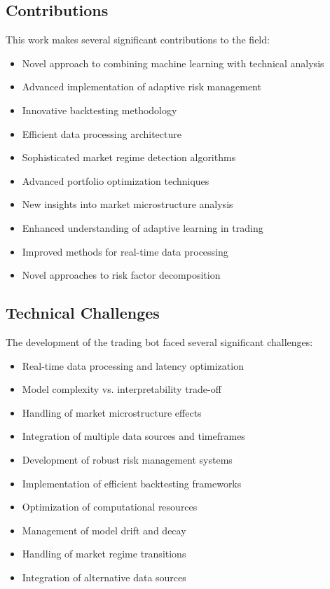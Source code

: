 \documentclass[conference]{IEEEtran}
\begin{document}
\subsection{Contributions}
This work makes several significant contributions to the field:
\begin{itemize}
    \item Novel approach to combining machine learning with technical analysis
    \item Advanced implementation of adaptive risk management
    \item Innovative backtesting methodology
    \item Efficient data processing architecture
    \item Sophisticated market regime detection algorithms
    \item Advanced portfolio optimization techniques
    \item New insights into market microstructure analysis
    \item Enhanced understanding of adaptive learning in trading
    \item Improved methods for real-time data processing
    \item Novel approaches to risk factor decomposition
\end{itemize}

\subsection{Technical Challenges}
The development of the trading bot faced several significant challenges:
\begin{itemize}
    \item Real-time data processing and latency optimization
    \item Model complexity vs. interpretability trade-off
    \item Handling of market microstructure effects
    \item Integration of multiple data sources and timeframes
    \item Development of robust risk management systems
    \item Implementation of efficient backtesting frameworks
    \item Optimization of computational resources
    \item Management of model drift and decay
    \item Handling of market regime transitions
    \item Integration of alternative data sources
\end{itemize}
\end{document}
